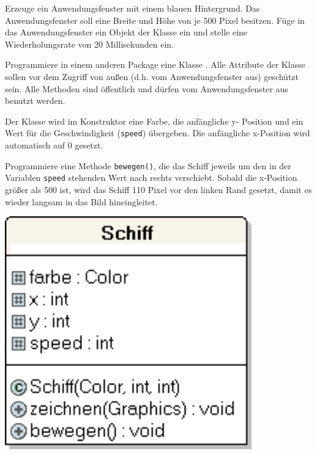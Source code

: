 \begin{compactenum}[a)]

\item Erzeuge ein Anwendungsfenster mit einem blauen Hintergrund. Das
Anwendungsfenster soll eine Breite und Höhe von je 500 Pixel besitzen. Füge in
das Anwendungsfenster ein Objekt der Klasse  ein und stelle eine
Wiederholungsrate von 20 Millisekunden ein.

\begin{minipage}{0.6\textwidth}
\item Programmiere in einem anderen Package eine Klasse . Alle
Attribute der Klasse  sollen vor dem Zugriff von außen (d.h.
vom Anwendungsfenster aus) geschützt sein. Alle Methoden sind öffentlich und
dürfen vom Anwendungsfenster aus benutzt werden.

Der Klasse  wird im Konstruktor eine Farbe, die anfängliche y-
Position und ein Wert für die Geschwindigkeit (\verb|speed|) übergeben. Die
anfängliche x-Position wird automatisch auf 0 gesetzt.

Programmiere eine Methode \verb|bewegen()|, die das Schiff jeweils um
den in der Variablen \verb|speed| stehenden Wert nach rechts verschiebt.
Sobald die x-Position größer als 500 ist, wird das Schiff 110 Pixel vor
den linken Rand gesetzt, damit es wieder langsam in das Bild
hineingleitet.
\end{minipage}
\hfill
\begin{minipage}{0.3\textwidth}
\includegraphics[width=0.8\textwidth]{./inf/SEKII/16_Java_Vererbung/Aufgabe5b1.png}
\end{minipage}


\end{compactenum}
